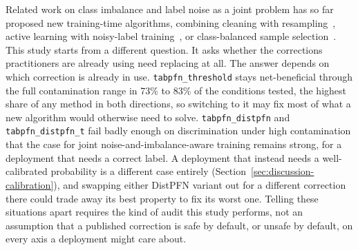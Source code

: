 Related work on class imbalance and label noise as a joint problem has so
far proposed new training-time algorithms, combining cleaning with
resampling~\cite{koziarski2020ccr}, active learning with noisy-label
training~\cite{khanal2024activelabel}, or class-balanced sample
selection~\cite{liu2024imbalancednoisy}. This study starts from a
different question. It asks whether the corrections practitioners are
already using need replacing at all. The answer depends on which
correction is already in use. \texttt{tabpfn\_threshold} stays
net-beneficial through the full contamination range in 73\% to 83\% of
the conditions tested, the highest share of any method in both
directions, so switching to it may fix most of what a new algorithm
would otherwise need to solve.
\texttt{tabpfn\_distpfn} and \texttt{tabpfn\_distpfn\_t} fail badly
enough on discrimination under high contamination that the case for
joint noise-and-imbalance-aware training remains strong, for a
deployment that needs a correct label. A deployment that instead needs a
well-calibrated probability is a different case entirely
(Section~\ref{sec:discussion-calibration}), and swapping either DistPFN
variant out for a different correction there could trade away its best
property to fix its worst one. Telling these situations apart requires
the kind of audit this study performs, not an assumption that a
published correction is safe by default, or unsafe by default, on every
axis a deployment might care about.
